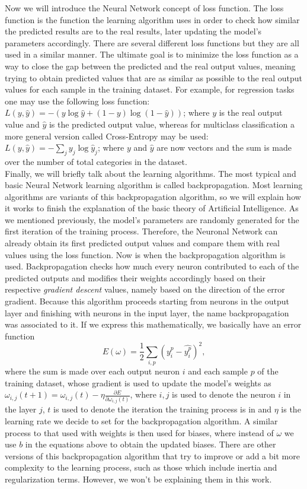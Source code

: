 Now we will introduce the Neural Network concept of loss function. The loss function is the function the learning algorithm uses in order to check how similar the predicted results are to the real results, later updating the model's parameters accordingly. There are several different loss functions but they are all used in a similar manner. The ultimate goal is to minimize the loss function as a way to close the gap between the predicted and the real output values, meaning trying to obtain predicted values that are as similar as possible to the real output values for each sample in the training dataset. For example, for regression tasks one may use the following loss function: $L(y,\hat{y}) = - ( y \log{\hat{y}} + (1-y) \log{(1-\hat{y})} )$; where $y$ is the real output value and $\hat{y}$ is the predicted output value, whereas for multiclass classification a more general version called Cross-Entropy may be used: $L(y,\hat{y}) = - \sum_j{y_j \log{\hat{y}_j}}$; where $y$ and $\hat{y}$ are now vectors and the sum is made over the number of total categories in the dataset.\\

Finally, we will briefly talk about the learning algorithms. The most typical and basic Neural Network learning algorithm is called backpropagation. Most learning algorithms are variants of this backpropagation algorithm, so we will explain how it works to finish the explanation of the basic theory of Artificial Intelligence. As we mentioned previously, the model's parameters are randomly generated for the first iteration of the training process. Therefore, the Neuronal Network can already obtain its first predicted output values and compare them with real values using the loss function. Now is when the backpropagation algorithm is used. Backpropagation checks how much every neuron contributed to each of the predicted outputs and modifies their weights accordingly based on their respective \textit{gradient descent} values, namely based on the direction of the error gradient. Because this algorithm proceeds starting from neurons in the output layer and finishing with neurons in the input layer, the name backpropagation was associated to it. If we express this mathematically, we basically have an error function $$ E(\omega) = \frac{1}{2} \sum_{i,p}{(y_i^p - \hat{y_i^p})^2} , $$
where the sum is made over each output neuron $i$ and each sample $p$ of the training dataset, whose gradient is used to update the model's weights as $ \omega_{i,j}(t+1) = \omega_{i,j}(t) - \eta \frac{\partial E}{\partial \omega_{i,j}(t)} $, where $i,j$ is used to denote the neuron $i$ in the layer $j$, $t$ is used to denote the iteration the training process is in and $\eta$ is the learning rate we decide to set for the backpropagation algorithm. A similar process to that used with weights is then used for biases, where instead of $\omega$ we use $b$ in the equations above to obtain the updated biases. There are other versions of this backpropagation algorithm that try to improve or add a bit more complexity to the learning process, such as those which include inertia and regularization terms. However, we won't be explaining them in this work.\\

